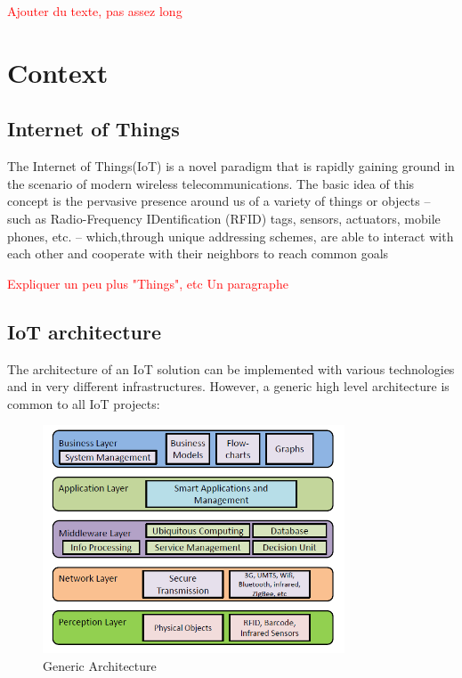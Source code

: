 \documentclass[11pt]{article}
\begin{document}
\textcolor{red}{Ajouter du texte, pas assez long}
\newpage



\section{Context}

\subsection{Internet of Things}

The Internet of Things(IoT) is a novel paradigm that is rapidly gaining ground in the scenario of modern wireless telecommunications. The basic idea of this concept is the pervasive presence around us of a variety of things or objects – such as Radio-Frequency IDentification (RFID) tags, sensors, actuators, mobile phones, etc. – which,through unique addressing schemes, are able to interact with each other and cooperate with their neighbors to reach common goals \cite{2}

\textcolor{red}{Expliquer un peu plus "Things", etc Un paragraphe}

\subsection{IoT architecture}

The architecture of an IoT solution can be implemented with various technologies and in very different infrastructures. However, a generic high level architecture is common to all IoT projects:
\begin{figure}[h]
	\includegraphics[width=0.8\textwidth]{assets/Abstract_IoT_Architecture.png} 
	\caption{Generic Architecture}
	\label{fig:genericArchitecture}
\end{figure}
\end{document}
